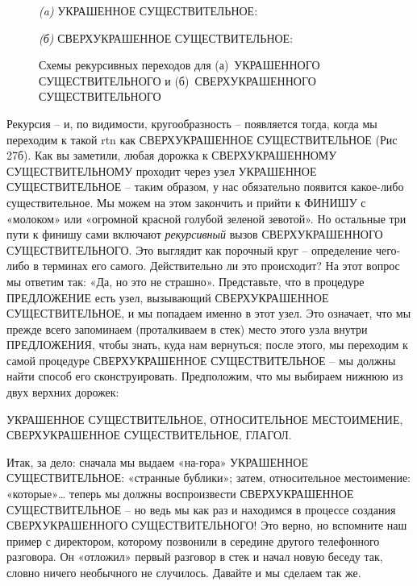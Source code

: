 \documentclass[../main.tex]{subfiles}
\begin{document}
\begin{figure}
    \textit{(a)} УКРАШЕННОЕ СУЩЕСТВИТЕЛЬНОЕ:\par
    \begin{adjustbox}{max width=\linewidth,center}
        
    \end{adjustbox}

    \bigskip

    \textit{(б)} СВЕРХУКРАШЕННОЕ СУЩЕСТВИТЕЛЬНОЕ:\par
    \begin{adjustbox}{max width=\linewidth+1cm,inner}
        
    \end{adjustbox}

    \caption{Схемы рекурсивных переходов для (а)~УКРАШЕННОГО СУЩЕСТВИТЕЛЬНОГО и (б)~СВЕРХУКРАШЕННОГО СУЩЕСТВИТЕЛЬНОГО}
    \label{fig:transition-schema}
\end{figure}

Рекурсия \--- и, по видимости, кругообразность \--- появляется тогда, когда мы переходим к такой \acs{rtn} как СВЕРХУКРАШЕННОЕ СУЩЕСТВИТЕЛЬНОЕ (Рис 27б). Как вы заметили, любая дорожка к СВЕРХУКРАШЕННОМУ СУЩЕСТВИТЕЛЬНОМУ проходит через узел УКРАШЕННОЕ СУЩЕСТВИТЕЛЬНОЕ \--- таким образом, у нас обязательно появится какое-либо существительное. Мы можем на этом закончить и прийти к ФИНИШУ с «молоком» или «огромной красной голубой зеленой зевотой». Но остальные три пути к финишу сами включают \emph{рекурсивный} вызов СВЕРХУКРАШЕННОГО СУЩЕСТВИТЕЛЬНОГО\@. Это выглядит как порочный круг \--- определение чего-либо в терминах его самого. Действительно ли это происходит? На этот вопрос мы ответим так: «Да, но это не страшно». Представьте, что в процедуре ПРЕДЛОЖЕНИЕ есть узел, вызывающий СВЕРХУКРАШЕННОЕ СУЩЕСТВИТЕЛЬНОЕ, и мы попадаем именно в этот узел. Это означает, что мы прежде всего запоминаем (проталкиваем в стек) место этого узла внутри ПРЕДЛОЖЕНИЯ, чтобы знать, куда нам вернуться; после этого, мы переходим к самой процедуре СВЕРХУКРАШЕННОЕ СУЩЕСТВИТЕЛЬНОЕ \--- мы должны найти способ его сконструировать. Предположим, что мы выбираем нижнюю из двух верхних дорожек:

УКРАШЕННОЕ СУЩЕСТВИТЕЛЬНОЕ, ОТНОСИТЕЛЬНОЕ МЕСТОИМЕНИЕ, СВЕРХУКРАШЕННОЕ СУЩЕСТВИТЕЛЬНОЕ, ГЛАГОЛ.

Итак, за дело: сначала мы выдаем «на-гора» УКРАШЕННОЕ СУЩЕСТВИТЕЛЬНОЕ: «странные бублики»; затем, относительное местоимение: «которые»\ldots{} теперь мы должны воспроизвести СВЕРХУКРАШЕННОЕ СУЩЕСТВИТЕЛЬНОЕ \--- но ведь мы как раз и находимся в процессе создания СВЕРХУКРАШЕННОГО СУЩЕСТВИТЕЛЬНОГО! Это верно, но вспомните наш пример с директором, которому позвонили в середине другого телефонного разговора. Он «отложил» первый разговор в стек и начал новую беседу так, словно ничего необычного не случилось. Давайте и мы сделаем так же.
\end{document}
